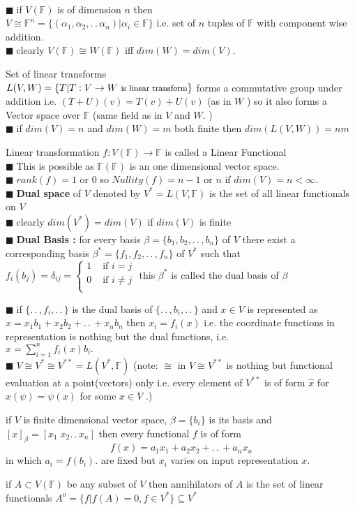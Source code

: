 \documentclass[11pt]{extarticle}
\newcommand{\F}{\mathbb{F}}
\newcommand{\ra}{\rightarrow}
\newcommand{\w}[1]{\text{#1}}
\newcommand{\ck}{.\,.\,}
\newcommand{\snote}[1]{{\footnotesize(#1)}}
\newcommand{\tbx}[2][]{
	\begin{tcolorbox}[enhanced,breakable,size=small,colback=black!2!white,title={#1},arc is angular, arc=1.5mm,drop fuzzy shadow]
		#2
	\end{tcolorbox}
}
\newcommand{\y}{$\blacksquare\;$}
\newcommand{\yi}{\\$\blacksquare\;$}
\begin{document}
\begin{multicols}{2}
{	 \yi if $ V(\F) $ is of dimension $ n $ then \\
	 $ V\cong \F^n=\{(\alpha_1,\alpha_2,\ck \alpha_n)|\alpha_i\in \F\} $ i.e. set of $ n $ tuples of $ \F $ with component wise addition. 
	 \yi clearly $ V(\F)\cong W(\F) $ iff $ dim(W)=dim(V).$ }
	 \tbx[Space of Linear Transform]{Set of linear transforms\\
	 	 $ L(V,W)=\{T| T :V\ra W \w{ \footnotesize  is linear transform}\} $ forms a commutative group under addition i.e. $ (T+U)(v)=T(v)+U(v) $ (as in $ W $ ) so it also forms a Vector space over $ \F $ (same field as in $ V$ and $W. $ )
	 \yi if $dim(V)=n$ and $ dim(W)=m $ both finite then $ dim(L(V,W)) =nm$ }
	 \tbx[Linear Functional]{Linear transformation $ f:V(\F)\ra \F $ is called a Linear Functional
	 \yi This is possible as $ \F(\F) $ is an one dimensional vector space.
	 \yi $ rank(f)=1 \w{ or } 0$ so $ Nullity(f)=n-1 \w{ or } n $ if $ dim(V)=n <\infty.$
	 \yi \textbf{Dual space } of $ V $ denoted by $V^*= L(V,\F) $ is the set of all linear functionals  on $ V $ 
	 \yi clearly $ dim(V^*)=dim(V) $ if $ dim(V) $ is finite
	 \yi \textbf{Dual Basis :} for every basis $ \beta =\{b_1,b_2,\ck , b_n\} $ of $ V $ there exist a corresponding basis $ \beta^*=\{f_1,f_2,\ck , f_n\} $ of $ V^* $ such that $ f_i(b_j)=\delta_{ij}=
	 \begin{cases}
	 	1 & \w{ if } i=j\\
	 	0 & \w{ if } i\neq j\\
	 \end{cases} $ this $ \beta^* $ is called the dual basis of $ \beta $ }
 \tbx{
 \y if $ \{\ck, f_i , \ck\} $ is the dual basis of $ \{\ck, b_i,\ck \} $ and $ x\in V $ is represented as $ x=x_1b_1+x_2b_2+\ck+x_nb_n $ then $ x_i=f_i(x) $ i.e. the coordinate functions in representation is nothing but the dual functions, i.e. \\$ x=\sum_{i=1}^{n} f_i(x)b_i .$ 
 \yi $ V\cong V^{*}\cong V^{**}= L(V^*,\F)$ \snote{note: $ \cong  $ in  $V\cong V^{**} $ is nothing but functional evaluation at a point(vectors) only i.e. every element of  $V^{**}  $ is of form $ \hat{x} $ for $ \hat{x}(\psi)=\psi(x)$ for some $ x\in V $ .} }
 \tbx[Functional representation Theorem]{ if $ V $ is finite dimensional vector space, $ \beta =\{b_i\} $ is its basis and $ [x]_\beta=[x_1\; x_2\ck x_n] $ then every functional $ f $ is of form 
 \[f(x)=a_1x_1+a_2x_2+\ck +a_nx_n\]  in which $ a_i=f(b_i).$ are fixed but $ x_i $ varies on input representation $ x. $ }
 \tbx[Annihilator]{ if $ A\subset V(\F) $ be any subset of $ V $ then annihilators  of $ A$ is the set of linear functionals $ A^o=\{f|f(A)=0,f\in V^*\}\subseteq V^* $ 
}
\end{multicols}
\end{document}
